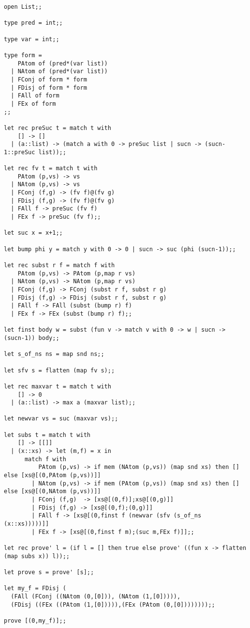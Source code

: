\documentclass[11pt,a4paper]{article}
\begin{document}
\begin{verbatim}
open List;;

type pred = int;;

type var = int;;

type form = 
    PAtom of (pred*(var list))
  | NAtom of (pred*(var list))
  | FConj of form * form
  | FDisj of form * form
  | FAll of form
  | FEx of form
;;

let rec preSuc t = match t with
    [] -> []
  | (a::list) -> (match a with 0 -> preSuc list | sucn -> (sucn-1::preSuc list));;

let rec fv t = match t with
    PAtom (p,vs) -> vs
  | NAtom (p,vs) -> vs
  | FConj (f,g) -> (fv f)@(fv g)
  | FDisj (f,g) -> (fv f)@(fv g)
  | FAll f -> preSuc (fv f)
  | FEx f -> preSuc (fv f);;

let suc x = x+1;;

let bump phi y = match y with 0 -> 0 | sucn -> suc (phi (sucn-1));;

let rec subst r f = match f with
    PAtom (p,vs) -> PAtom (p,map r vs)
  | NAtom (p,vs) -> NAtom (p,map r vs)
  | FConj (f,g) -> FConj (subst r f, subst r g)
  | FDisj (f,g) -> FDisj (subst r f, subst r g)
  | FAll f -> FAll (subst (bump r) f)
  | FEx f -> FEx (subst (bump r) f);;

let finst body w = subst (fun v -> match v with 0 -> w | sucn -> (sucn-1)) body;;

let s_of_ns ns = map snd ns;;

let sfv s = flatten (map fv s);;

let rec maxvar t = match t with
    [] -> 0
  | (a::list) -> max a (maxvar list);;

let newvar vs = suc (maxvar vs);;

let subs t = match t with 
    [] -> [[]]
  | (x::xs) -> let (m,f) = x in
      match f with 
          PAtom (p,vs) -> if mem (NAtom (p,vs)) (map snd xs) then [] else [xs@[(0,PAtom (p,vs))]]
        | NAtom (p,vs) -> if mem (PAtom (p,vs)) (map snd xs) then [] else [xs@[(0,NAtom (p,vs))]]
        | FConj (f,g)  -> [xs@[(0,f)];xs@[(0,g)]]
        | FDisj (f,g) -> [xs@[(0,f);(0,g)]]
        | FAll f -> [xs@[(0,finst f (newvar (sfv (s_of_ns (x::xs)))))]]
        | FEx f -> [xs@[(0,finst f m);(suc m,FEx f)]];;

let rec prove' l = (if l = [] then true else prove' ((fun x -> flatten (map subs x)) l));;

let prove s = prove' [s];;

let my_f = FDisj (
  (FAll (FConj ((NAtom (0,[0])), (NAtom (1,[0])))),
  (FDisj ((FEx ((PAtom (1,[0])))),(FEx (PAtom (0,[0])))))));;

prove [(0,my_f)];;
\end{verbatim}



\end{document}
